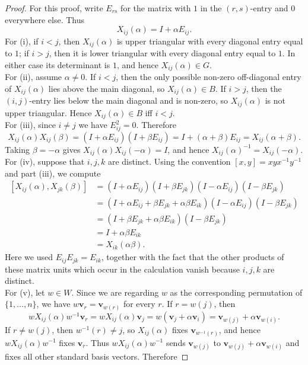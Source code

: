\documentclass[../Odyssey_Project.tex]{subfiles}
\begin{document}
\begin{proof}
For this proof, write $E_{rs}$ for the matrix with $1$ in the $(r,s)$-entry and $0$ everywhere else. Thus
\[
    X_{ij}(\alpha)=I+\alpha E_{ij}.
\]
For (i), if $i<j$, then $X_{ij}(\alpha)$ is upper triangular with every diagonal entry equal to $1$; if $i>j$, then it is lower triangular with every diagonal entry equal to $1$. In either case its determinant is $1$, and hence $X_{ij}(\alpha) \in G$.\\
For (ii), assume $\alpha\neq 0$. If $i<j$, then the only possible non-zero off-diagonal entry of $X_{ij}(\alpha)$ lies above the main diagonal, so $X_{ij}(\alpha) \in B$. If $i>j$, then the $(i,j)$-entry lies below the main diagonal and is non-zero, so $X_{ij}(\alpha)$ is not upper triangular. Hence $X_{ij}(\alpha) \in B$ iff $i<j$.\\
For (iii), since $i\neq j$ we have $E_{ij}^2=0$. Therefore
\[
    X_{ij}(\alpha)X_{ij}(\beta)
    =(I+\alpha E_{ij})(I+\beta E_{ij})
    =I+(\alpha+\beta)E_{ij}
    =X_{ij}(\alpha+\beta).
\]
Taking $\beta=-\alpha$ gives $X_{ij}(\alpha)X_{ij}(-\alpha)=I$, and hence $X_{ij}(\alpha)^{-1}=X_{ij}(-\alpha)$.\\
For (iv), suppose that $i,j,k$ are distinct. Using the convention $[x,y]=xyx^{-1}y^{-1}$ and part (iii), we compute
\[
\begin{aligned}
    [X_{ij}(\alpha),X_{jk}(\beta)]
    &=(I+\alpha E_{ij})(I+\beta E_{jk})(I-\alpha E_{ij})(I-\beta E_{jk})\\
    &=(I+\alpha E_{ij}+\beta E_{jk}+\alpha\beta E_{ik})(I-\alpha E_{ij})(I-\beta E_{jk})\\
    &=(I+\beta E_{jk}+\alpha\beta E_{ik})(I-\beta E_{jk})\\
    &=I+\alpha\beta E_{ik}\\
    &=X_{ik}(\alpha\beta).
\end{aligned}
\]
Here we used $E_{ij}E_{jk}=E_{ik}$, together with the fact that the other products of these matrix units which occur in the calculation vanish because $i,j,k$ are distinct.\\
For (v), let $w\in W$. Since we are regarding $w$ as the corresponding permutation of $\{1,\ldots,n\}$, we have $w\mathbf{v}_r=\mathbf{v}_{w(r)}$ for every $r$. If $r=w(j)$, then
\[
    wX_{ij}(\alpha)w^{-1}\mathbf{v}_r
    =wX_{ij}(\alpha)\mathbf{v}_j
    =w(\mathbf{v}_j+\alpha\mathbf{v}_i)
    =\mathbf{v}_{w(j)}+\alpha\mathbf{v}_{w(i)}.
\]
If $r\neq w(j)$, then $w^{-1}(r)\neq j$, so $X_{ij}(\alpha)$ fixes $\mathbf{v}_{w^{-1}(r)}$, and hence $wX_{ij}(\alpha)w^{-1}$ fixes $\mathbf{v}_r$. Thus $wX_{ij}(\alpha)w^{-1}$ sends $\mathbf{v}_{w(j)}$ to $\mathbf{v}_{w(j)}+\alpha\mathbf{v}_{w(i)}$ and fixes all other standard basis vectors. Therefore

\end{proof}
\end{document}
